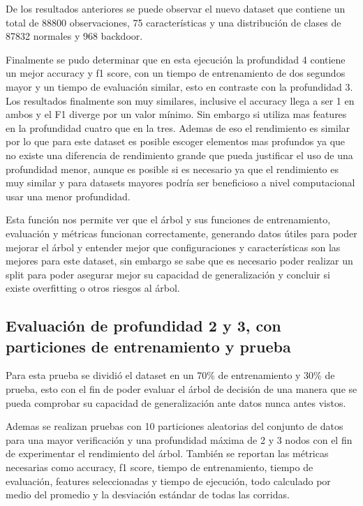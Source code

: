\documentclass[12pt,a4paper]{article}
\begin{document}
De los resultados anteriores se puede observar el nuevo dataset que contiene un total de 88800 observaciones, 75 características y
una distribución de clases de 87832 normales y 968 backdoor.

Finalmente se pudo determinar que en esta ejecución la profundidad 4 contiene un mejor accuracy y f1 score, con un tiempo de entrenamiento
de dos segundos mayor y un tiempo de evaluación similar, esto en contraste con la profundidad 3. Los resultados finalmente son muy similares,
inclusive el accuracy llega a ser 1 en ambos y el F1 diverge por un valor mínimo. Sin embargo si utiliza mas features en la profundidad cuatro que en la tres.
Ademas de eso el rendimiento es similar por lo que para este dataset es posible escoger elementos mas profundos ya que no existe una diferencia de rendimiento
grande que pueda justificar el uso de una profundidad menor, aunque es posible si es necesario ya que el rendimiento es muy similar y para datasets mayores podría ser
beneficioso a nivel computacional usar una menor profundidad.

Esta función nos permite ver que el árbol y sus funciones de entrenamiento, evaluación y métricas funcionan correctamente, generando
datos útiles para poder mejorar el árbol y entender mejor que configuraciones y características son las mejores para este dataset, sin embargo se sabe que
es necesario poder realizar un split para poder asegurar mejor su capacidad de generalización y concluir si existe overfitting o otros riesgos al árbol.

\subsection{Evaluación de profundidad 2 y 3, con particiones de entrenamiento y prueba}\label{subsec:evaluacion-de-profundidad-2-y-3-con-particiones-de-entrenamiento-y-prueba}

Para esta prueba se dividió el dataset en un 70\% de entrenamiento y 30\% de prueba, esto con el fin de poder
evaluar el árbol de decisión de una manera que se pueda comprobar su capacidad de generalización ante datos nunca antes vistos.

Ademas se realizan pruebas con 10 particiones aleatorias del conjunto de datos para una mayor verificación y una profundidad máxima de 2 y 3 nodos
con el fin de experimentar el rendimiento del árbol.
También se reportan las métricas necesarias como accuracy, f1 score, tiempo de entrenamiento,
tiempo de evaluación, features seleccionadas y tiempo de ejecución, todo calculado por medio del promedio y la desviación estándar de todas las corridas.
\end{document}
